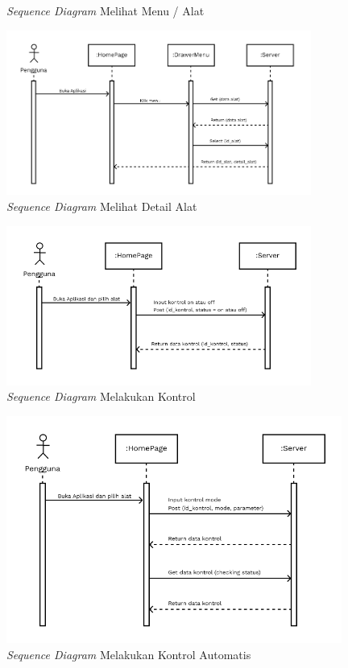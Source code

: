 \begin{flushleft}
\begin{justify}
\begin{enumerate}[label=\alph*.]
\begin{figure}[ht]
                \caption{\textit{Sequence Diagram} Melihat Menu / Alat}
            \end{figure}
            \vspace{10cm}
            \begin{figure}[ht]
                \centering
                \includegraphics[width=10cm]{images/bab 4/Sequence buka detail alat.png}
                \caption{\textit{Sequence Diagram} Melihat Detail Alat}
            \end{figure}

            \begin{figure}[ht]
                \centering
                \includegraphics[width=10cm]{images/bab 4/Sequence kontrol.png}
                \caption{\textit{Sequence Diagram} Melakukan Kontrol}
            \end{figure}
            \begin{figure}[ht]
                \centering
                \includegraphics[width=11cm]{images/bab 4/Sequence kontrol Auto.png}
                \caption{\textit{Sequence Diagram} Melakukan Kontrol Automatis}
            \end{figure}
            \end{enumerate}
            \vspace{10cm}

\end{justify}
\end{flushleft}
